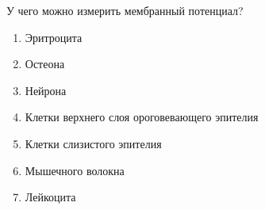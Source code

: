 
У чего можно измерить мембранный потенциал?

\begin{enumerate}
    \item Эритроцита
    \item Остеона
    \item Нейрона
    \item Клетки верхнего слоя ороговевающего эпителия
    \item Клетки слизистого эпителия
    \item Мышечного волокна
    \item Лейкоцита
\end{enumerate}

